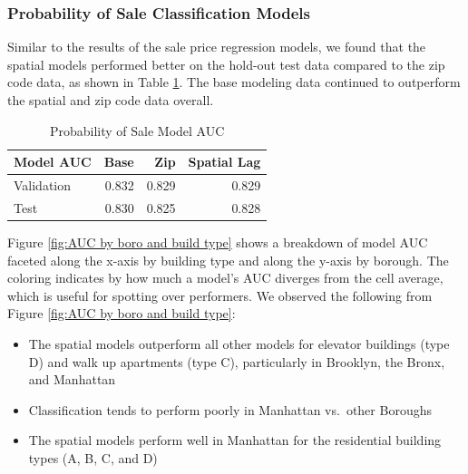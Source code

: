 \documentclass[conference,final,]{IEEEtran}
\providecommand{\tightlist}{%
  \setlength{\itemsep}{0pt}\setlength{\parskip}{0pt}}
\begin{document}
\hypertarget{probability-of-sale-classification-models}{%
\subsubsection{Probability of Sale Classification
Models}\label{probability-of-sale-classification-models}}

Similar to the results of the sale price regression models, we found
that the spatial models performed better on the hold-out test data
compared to the zip code data, as shown in Table
\ref{tab:ProbSaleModelAUC}. The base modeling data continued to
outperform the spatial and zip code data overall.

\begin{table}

\caption{\label{tab:Prob Model AUC}\label{tab:ProbSaleModelAUC} Probability of Sale Model AUC}
\centering
\begin{tabular}[t]{l|r|r|r}
\hline
Model AUC & Base & Zip & Spatial Lag\\
\hline
Validation & 0.832 & 0.829 & 0.829\\
\hline
Test & 0.830 & 0.825 & 0.828\\
\hline
\end{tabular}
\end{table}

Figure \ref{fig:AUC by boro and build type} shows a breakdown of model
AUC faceted along the x-axis by building type and along the y-axis by
borough. The coloring indicates by how much a model's AUC diverges from
the cell average, which is useful for spotting over performers. We
observed the following from Figure \ref{fig:AUC by boro and build type}:

\begin{itemize}
\tightlist
\item
  The spatial models outperform all other models for elevator buildings
  (type D) and walk up apartments (type C), particularly in Brooklyn,
  the Bronx, and Manhattan
\item
  Classification tends to perform poorly in Manhattan vs.~other Boroughs
\item
  The spatial models perform well in Manhattan for the residential
  building types (A, B, C, and D)
\end{itemize}
\end{document}
